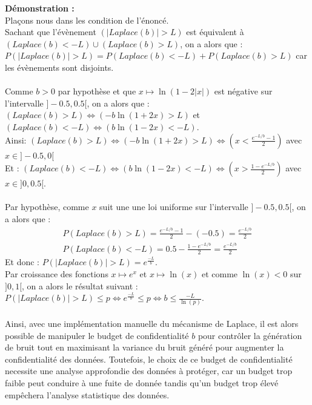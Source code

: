 \documentclass{article}
\begin{document}
\textbf{Démonstration :}\\
Plaçons nous dans les condition de l'énoncé.\\
Sachant que l'évènement $(|Laplace(b)| > L)$ est équivalent à $(Laplace(b)<-L) \cup (Laplace(b)>L)$, on a alors que :
\(P( |Laplace(b)| > L) = P(Laplace(b)<-L) + P(Laplace(b)>L) \) car les évènements sont disjoints.\\
\\
Comme $b>0$ par hypothèse et que $x\mapsto \ln(1 - 2|x|)$ est négative sur l'intervalle $]-0.5, 0.5[$, on a alors que :
\( (Laplace(b)>L) \Leftrightarrow (-b \ln(1+2x)>L)\) et \( (Laplace(b)<-L) \Leftrightarrow (b \ln(1-2x)<-L)\). \\
Ainsi: $ (Laplace(b)>L) \Leftrightarrow ( -b \ln(1+2x)>L) \Leftrightarrow (x < \frac{ e^{-L/b}-1}{2})$ avec $x\in]-0.5,0[$\\
Et : $ (Laplace(b)<-L) \Leftrightarrow ( b \ln(1-2x)<-L) \Leftrightarrow (x > \frac{ 1-e^{-L/b}}{2})$ avec $x\in]0,0.5[$.\\
\\
Par hypothèse, comme $x$ suit une une loi uniforme sur l'intervalle $]-0.5, 0.5[$, on a alors que :
\begin{align*}
    P(Laplace(b)>L) = \frac{ e^{-L/b}-1}{2} - (-0.5) = \frac{ e^{-L/b}}{2} \\
    P(Laplace(b)<-L) = 0.5 - \frac{ 1-e^{-L/b}}{2} = \frac{ e^{-L/b}}{2}
\end{align*}
Et donc : $P( |Laplace(b)| > L) = e^{\frac{-L}{b}}$.\\
Par croissance des fonctions $x\mapsto e^x$ et $x\mapsto \ln(x)$ et comme $\ln(x)<0$ sur $]0,1[$, on a alors le résultat suivant : $P( |Laplace(b)| > L) \leq p \Leftrightarrow e^{\frac{-L}{b}} \leq p \Leftrightarrow b \leq \frac{-L}{\ln(p)}$.\\
\\
Ainsi, avec une implémentation manuelle du mécanisme de Laplace, il est alors possible de manipuler le budget de confidentialité $b$ pour contrôler
la génération de bruit tout en maximisant la variance du bruit généré pour augmenter la confidentialité des données. Toutefois, le choix de ce budget 
de confidentialité necessite une analyse approfondie des données à protéger, car un budget trop faible peut conduire à une fuite de donnée tandis qu'un 
budget trop élevé empêchera l'analyse statistique des données.
\end{document}
